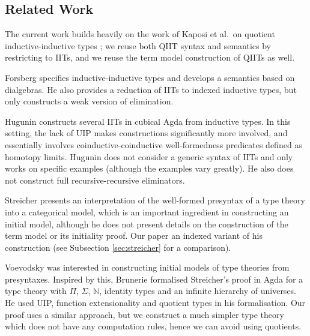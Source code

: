 \documentclass[a4paper,UKenglish,cleveref, autoref]{lipics-v2019}
\begin{document}


\subsection{Related Work}

The current work builds heavily on the work of Kaposi et al.\ on quotient
inductive-inductive types \cite{Kaposi:2019:CQI:3302515.3290315}; we reuse both
QIIT syntax and semantics by restricting to IITs, and we reuse the term model
construction of QIITs as well.

Forsberg \cite{forsberg-phd} specifies inductive-inductive types and develops a
semantics based on dialgebras. He also provides a reduction of IITs to indexed
inductive types, but only constructs a weak version of elimination.

Hugunin \cite{jasper} constructs several IITs in cubical Agda from inductive
types. In this setting, the lack of UIP makes constructions significantly more
involved, and essentially involves coinductive-coinductive well-formedness
predicates defined as homotopy limits. Hugunin does not consider a generic
syntax of IITs and only works on specific examples (although the examples vary
greatly). He also does not construct full recursive-recursive eliminators.

Streicher \cite{streichersemantics} presents an interpretation of the well-formed
presyntax of a type theory into a categorical model, which is an important
ingredient in constructing an initial model, although he does not present
details on the construction of the term model or its initiality proof. Our paper an indexed variant of his construction (see Subsection \ref{sec:streicher} for a comparison).

Voevodsky was interested in constructing initial models of type
theories from presyntaxes. Inspired by this, Brunerie \cite{brunerie}
formalised Streicher's proof in Agda for a type theory with $\Pi$,
$\Sigma$, $\mathbb{N}$, identity types and an infinite hierarchy of
universes. He used UIP, function extensionality and quotient types in
his formalisation. Our proof uses a similar approach, but we construct
a much simpler type theory which does not have any computation rules,
hence we can avoid using quotients.
\end{document}
